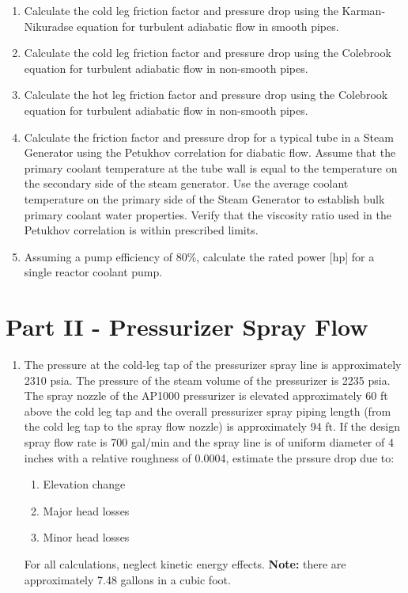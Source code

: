 \begin{fullwidth}
\begin{enumerate}
\item Calculate the cold leg friction factor and pressure drop using the Karman-Nikuradse equation for turbulent adiabatic flow in smooth pipes.

\vspace{1.0cm}

\item Calculate the cold leg friction factor and pressure drop using the Colebrook equation for turbulent adiabatic flow in non-smooth pipes.

\vspace{1.0cm}
\item Calculate the hot leg friction factor and pressure drop using the Colebrook equation for turbulent adiabatic flow in non-smooth pipes.

\vspace{1.0cm}

\item Calculate the friction factor and pressure drop for a typical tube in a Steam Generator using the Petukhov correlation for diabatic flow.  Assume that the primary coolant temperature at the tube wall is equal to the temperature on the secondary side of the steam generator.  Use the average coolant temperature on the primary side of the Steam Generator to establish bulk primary coolant water properties.  Verify that the viscosity ratio used in the Petukhov correlation is within prescribed limits.

\vspace{1.0 cm}

\item Assuming a pump efficiency of 80\%, calculate the rated power [hp] for a single reactor coolant pump.


\end{enumerate}

\section{Part II - Pressurizer Spray Flow}

\begin{enumerate}[resume]
\item The pressure at the cold-leg tap of the pressurizer spray line is approximately 2310 psia.  The pressure of the steam volume of the pressurizer is 2235 psia.  The spray nozzle of the AP1000 pressurizer is elevated approximately 60 ft above the cold leg tap and the overall pressurizer spray piping length (from the cold leg tap to the spray flow nozzle) is approximately 94 ft.  If the design spray flow rate is 700 gal/min and the spray line is of uniform diameter of 4 inches with a relative roughness of 0.0004, estimate the prssure drop due to:
\begin{enumerate}
\item Elevation change
\item Major head losses
\item Minor head losses
\end{enumerate}
For all calculations, neglect kinetic energy effects.  \textbf{Note:} there are approximately 7.48 gallons in a cubic foot.


\end{enumerate}
\end{fullwidth}
